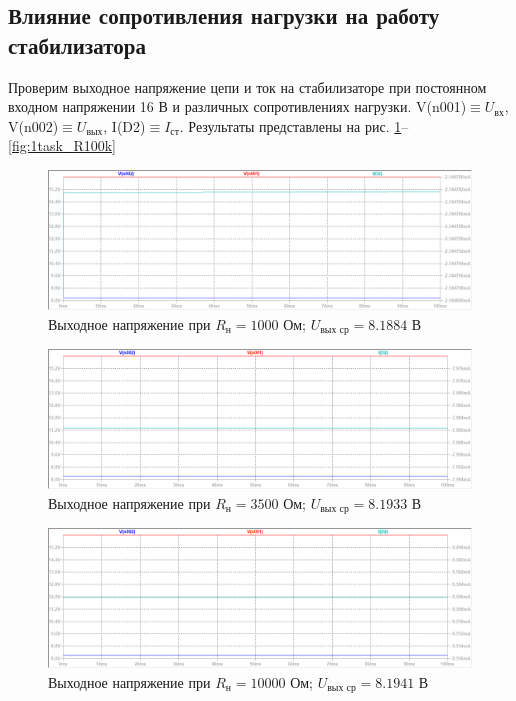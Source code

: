 \documentclass[a4paper, 12pt]{article}
\begin{document}
    \subsection{Влияние сопротивления нагрузки на работу стабилизатора}
    Проверим выходное напряжение цепи и ток на стабилизаторе при постоянном входном напряжении
    16 В и различных сопротивлениях нагрузки. V(n001)$\equiv U_{\text{вх}}$, V(n002)$\equiv U_{\text{вых}}$,
    I(D2)$\equiv I_{\text{ст}}$. Результаты представлены на рис.
    \ref{fig:1task_R1k}--\ref{fig:1task_R100k}
    \begin{figure}[H]
        \centering
        \includegraphics[scale=0.46]{1task_R1k.png}
        \captionsetup{skip=0pt}
        \caption{Выходное напряжение при $R_{\text{н}}=1000$ Ом; $U_{\text{вых ср}}=8.1884$ В}
        \label{fig:1task_R1k}
    \end{figure}
    \begin{figure}[H]
        \centering
        \includegraphics[scale=0.46]{1task_R3_5k.png}
        \captionsetup{skip=0pt}
        \caption{Выходное напряжение при $R_{\text{н}}=3500$ Ом; $U_{\text{вых ср}}=8.1933$ В}
        \label{fig:1task_R3_5k}
    \end{figure}
    \begin{figure}[H]
        \centering
        \includegraphics[scale=0.46]{1task_R10k.png}
        \captionsetup{skip=0pt}
        \caption{Выходное напряжение при $R_{\text{н}}=10000$ Ом; $U_{\text{вых ср}}=8.1941$ В}
        \label{fig:1task_R10k}
    \end{figure}
\end{document}
